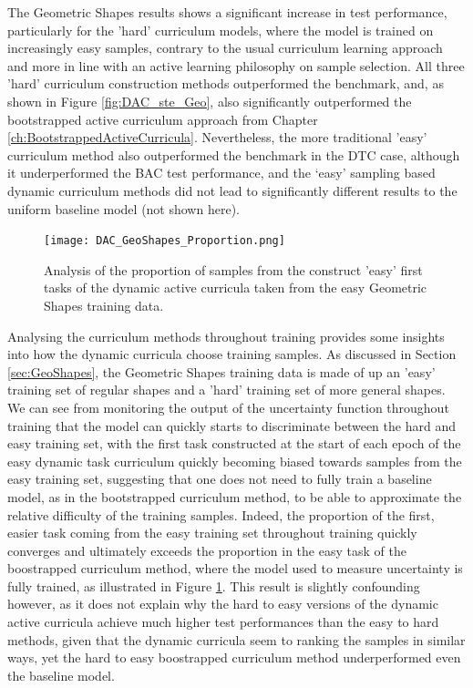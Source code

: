 The Geometric Shapes results shows a significant increase in test performance, particularly for the 'hard' curriculum models, where the model is trained on increasingly easy samples, contrary to the usual curriculum learning approach and more in line with an active learning philosophy on sample selection. All three 'hard' curriculum construction methods outperformed the benchmark, and, as shown in Figure \ref{fig:DAC_ste_Geo}, also significantly outperformed the bootstrapped active curriculum approach from Chapter \ref{ch:BootstrappedActiveCurricula}. Nevertheless, the more traditional 'easy' curriculum method also outperformed the benchmark in the DTC case, although it underperformed the BAC test performance, and the `easy' sampling based dynamic curriculum methods did not lead to significantly different results to the uniform baseline model (not shown here). 

\begin{figure}[h!]
\hspace*{-1.5cm}    
\centering
\texttt{[image: DAC\_GeoShapes\_Proportion.png]}
\caption{Analysis of the proportion of samples from the construct 'easy' first tasks of the dynamic active curricula taken from the easy Geometric Shapes training data.}
\label{fig:GeoShapes_DAC_Prop}
\end{figure}


Analysing the curriculum methods throughout training provides some insights into how the dynamic curricula choose training samples. As discussed in Section \ref{sec:GeoShapes}, the Geometric Shapes training data is made of up an 'easy' training set of regular shapes and a 'hard' training set of more general shapes. We can see from monitoring the output of the uncertainty function throughout training that the model can quickly starts to discriminate between the hard and easy training set, with the first task constructed at the start of each epoch of the easy dynamic task curriculum quickly becoming biased towards samples from the easy training set, suggesting that one does not need to fully train a baseline model, as in the bootstrapped curriculum method, to be able to approximate the relative difficulty of the training samples. Indeed, the proportion of the first, easier task coming from the easy training set throughout training quickly converges and ultimately exceeds the proportion in the easy task of the boostrapped curriculum method, where the model used to measure uncertainty is fully trained, as illustrated in Figure \ref{fig:GeoShapes_DAC_Prop}. This result is slightly confounding however, as it does not explain why the hard to easy versions of the dynamic active curricula achieve much higher test performances than the easy to hard methods, given that the dynamic curricula seem to ranking the samples in similar ways, yet the hard to easy boostrapped curriculum method underperformed even the baseline model. 



